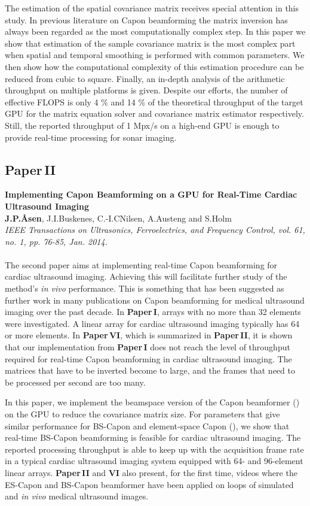 The estimation of the spatial covariance matrix receives special attention in this study. In previous literature on Capon beamforming the matrix inversion has always been regarded as the most computationally complex step. In this paper we show that estimation of the sample covariance matrix is the most complex part when spatial and temporal smoothing is performed with common parameters. We then show how the computational complexity of this estimation procedure can be reduced from cubic to square. Finally, an in-depth analysis of the arithmetic throughput on multiple platforms is given. Despite our efforts, the number of effective FLOPS is only 4 \% and 14 \% of the theoretical throughput of the target GPU for the matrix equation solver and covariance matrix estimator respectively. Still, the reported throughput of 1 Mpx/s on a high-end GPU is enough to provide real-time processing for sonar imaging.

\subsection{Paper\,II}
\textbf{Implementing Capon Beamforming on a GPU for Real-Time Cardiac Ultrasound Imaging}\\
\textbf{J.\:P.\:\AA{}sen}, J.\:I.\:Buskenes, C.-I.\:C\:Nilsen, A.\:Austeng and S.\:Holm\\
{\it IEEE Transactions on Ultrasonics, Ferroelectrics, and Frequency Control, vol. 61, no. 1, pp. 76-85, Jan. 2014.}\\\\
The second paper aims at implementing real-time Capon beamforming for cardiac ultrasound imaging. Achieving this will facilitate further study of the method's \textit{in vivo} performance. This is something that has been suggested as further work in many publications on Capon beamforming for medical ultrasound imaging over the past decade. In \textbf{Paper\,I}, arrays with no more than 32 elements were investigated. A linear array for cardiac ultrasound imaging typically has 64 or more elements. In \textbf{Paper\,VI}, which is summarized in \textbf{Paper\,II}, it is shown that our implementation from  \textbf{Paper\,I} does not reach the level of throughput required for real-time Capon beamforming in cardiac ultrasound imaging. The matrices that have to be inverted become to large, and the frames that need to be processed per second are too many.

In this paper, we implement the beamspace version of the Capon beamformer () on the GPU  to reduce the covariance matrix size. For parameters that give similar performance for BS-Capon and element-space Capon (), we show that real-time BS-Capon beamforming is feasible for cardiac ultrasound imaging. The reported processing throughput is able to keep up with the acquisition frame rate in a typical cardiac ultrasound imaging system equipped with 64- and 96-element linear arrays.  \textbf{Paper\,II} and \textbf{VI} also present, for the first time, videos where the ES-Capon and BS-Capon beamformer have been applied on loops of simulated and \textit{in vivo} medical ultrasound images.

